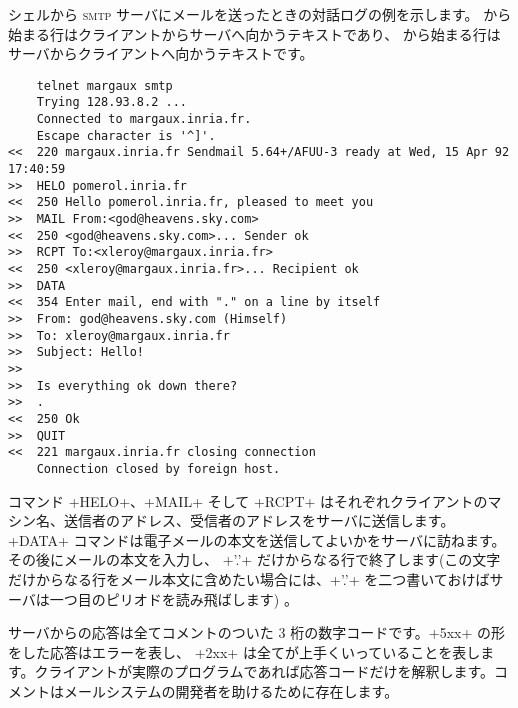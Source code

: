 \begin{example}
シェルから \textsc{smtp} サーバにメールを送ったときの対話ログの例を示します。\ifhtmlelse{>>}{$\rightarrow$} から始まる行はクライアントからサーバへ向かうテキストであり、\ifhtmlelse{<<}{$\leftarrow$} から始まる行はサーバからクライアントへ向かうテキストです。
{
\begin{lstlisting}
    telnet margaux smtp
    Trying 128.93.8.2 ...
    Connected to margaux.inria.fr.
    Escape character is '^]'.
<<  220 margaux.inria.fr Sendmail 5.64+/AFUU-3 ready at Wed, 15 Apr 92 17:40:59
>>  HELO pomerol.inria.fr
<<  250 Hello pomerol.inria.fr, pleased to meet you
>>  MAIL From:<god@heavens.sky.com>
<<  250 <god@heavens.sky.com>... Sender ok
>>  RCPT To:<xleroy@margaux.inria.fr>
<<  250 <xleroy@margaux.inria.fr>... Recipient ok
>>  DATA
<<  354 Enter mail, end with "." on a line by itself
>>  From: god@heavens.sky.com (Himself)
>>  To: xleroy@margaux.inria.fr
>>  Subject: Hello!
>>
>>  Is everything ok down there?
>>  .
<<  250 Ok
>>  QUIT
<<  221 margaux.inria.fr closing connection
    Connection closed by foreign host.
\end{lstlisting}}
コマンド \ml+HELO+、\ml+MAIL+ そして \ml+RCPT+ はそれぞれクライアントのマシン名、送信者のアドレス、受信者のアドレスをサーバに送信します。\ml+DATA+ コマンドは電子メールの本文を送信してよいかをサーバに訪ねます。その後にメールの本文を入力し、 \ml+'.'+ だけからなる行で終了します(この文字だけからなる行をメール本文に含めたい場合には、\ml+'.'+ を二つ書いておけばサーバは一つ目のピリオドを読み飛ばします) 。

サーバからの応答は全てコメントのついた 3 桁の数字コードです。\ml+5xx+ の形をした応答はエラーを表し、 \ml+2xx+ は全てが上手くいっていることを表します。クライアントが実際のプログラムであれば応答コードだけを解釈します。コメントはメールシステムの開発者を助けるために存在します。
\end{example}

